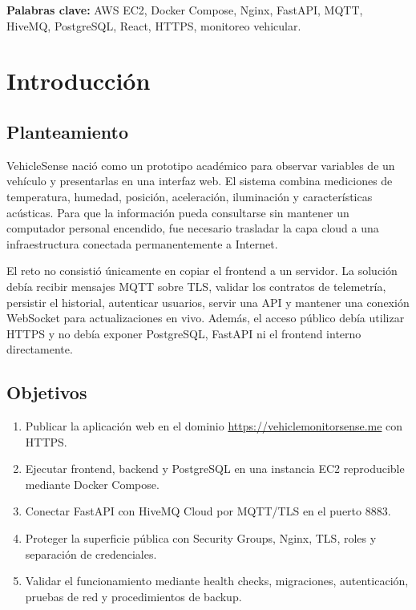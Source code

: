 \documentclass[12pt,a4paper,oneside]{report}
\begin{document}
\textbf{Palabras clave:} AWS EC2, Docker Compose, Nginx, FastAPI, MQTT, HiveMQ,
PostgreSQL, React, HTTPS, monitoreo vehicular.

\tableofcontents
\clearpage
{}

\chapter{Introducción}

\section{Planteamiento}

VehicleSense nació como un prototipo académico para observar variables de un
vehículo y presentarlas en una interfaz web. El sistema combina mediciones de
temperatura, humedad, posición, aceleración, iluminación y características
acústicas. Para que la información pueda consultarse sin mantener un computador
personal encendido, fue necesario trasladar la capa cloud a una infraestructura
conectada permanentemente a Internet.

El reto no consistió únicamente en copiar el frontend a un servidor. La solución
debía recibir mensajes MQTT sobre TLS, validar los contratos de telemetría,
persistir el historial, autenticar usuarios, servir una API y mantener una conexión
WebSocket para actualizaciones en vivo. Además, el acceso público debía utilizar
HTTPS y no debía exponer PostgreSQL, FastAPI ni el frontend interno directamente.

\section{Objetivos}

\begin{enumerate}
  \item Publicar la aplicación web en el dominio
        \url{https://vehiclemonitorsense.me} con HTTPS.
  \item Ejecutar frontend, backend y PostgreSQL en una instancia EC2 reproducible
        mediante Docker Compose.
  \item Conectar FastAPI con HiveMQ Cloud por MQTT/TLS en el puerto 8883.
  \item Proteger la superficie pública con Security Groups, Nginx, TLS, roles y
        separación de credenciales.
  \item Validar el funcionamiento mediante health checks, migraciones,
        autenticación, pruebas de red y procedimientos de backup.
\end{enumerate}
\end{document}
